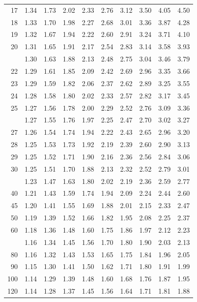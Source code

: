 \documentclass[10pt]{article}
\begin{document}
\begin{longtable}{@{}r!{\vrule width 0.8pt\hspace{0.55em}}rrrrrrrrr@{}}
17 & 1.34 & 1.73 & 2.02 & 2.33 & 2.76 & 3.12 & 3.50 & 4.05 & 4.50 \\
18 & 1.33 & 1.70 & 1.98 & 2.27 & 2.68 & 3.01 & 3.36 & 3.87 & 4.28 \\
19 & 1.32 & 1.67 & 1.94 & 2.22 & 2.60 & 2.91 & 3.24 & 3.71 & 4.10 \\
20 & 1.31 & 1.65 & 1.91 & 2.17 & 2.54 & 2.83 & 3.14 & 3.58 & 3.93 \\
 & 1.30 & 1.63 & 1.88 & 2.13 & 2.48 & 2.75 & 3.04 & 3.46 & 3.79 \\
22 & 1.29 & 1.61 & 1.85 & 2.09 & 2.42 & 2.69 & 2.96 & 3.35 & 3.66 \\
23 & 1.29 & 1.59 & 1.82 & 2.06 & 2.37 & 2.62 & 2.89 & 3.25 & 3.55 \\
24 & 1.28 & 1.58 & 1.80 & 2.02 & 2.33 & 2.57 & 2.82 & 3.17 & 3.45 \\
25 & 1.27 & 1.56 & 1.78 & 2.00 & 2.29 & 2.52 & 2.76 & 3.09 & 3.36 \\
 & 1.27 & 1.55 & 1.76 & 1.97 & 2.25 & 2.47 & 2.70 & 3.02 & 3.27 \\
27 & 1.26 & 1.54 & 1.74 & 1.94 & 2.22 & 2.43 & 2.65 & 2.96 & 3.20 \\
28 & 1.25 & 1.53 & 1.73 & 1.92 & 2.19 & 2.39 & 2.60 & 2.90 & 3.13 \\
29 & 1.25 & 1.52 & 1.71 & 1.90 & 2.16 & 2.36 & 2.56 & 2.84 & 3.06 \\
30 & 1.25 & 1.51 & 1.70 & 1.88 & 2.13 & 2.32 & 2.52 & 2.79 & 3.01 \\
 & 1.23 & 1.47 & 1.63 & 1.80 & 2.02 & 2.19 & 2.36 & 2.59 & 2.77 \\
40 & 1.21 & 1.43 & 1.59 & 1.74 & 1.94 & 2.09 & 2.24 & 2.44 & 2.60 \\
45 & 1.20 & 1.41 & 1.55 & 1.69 & 1.88 & 2.01 & 2.15 & 2.33 & 2.47 \\
50 & 1.19 & 1.39 & 1.52 & 1.66 & 1.82 & 1.95 & 2.08 & 2.25 & 2.37 \\
60 & 1.18 & 1.36 & 1.48 & 1.60 & 1.75 & 1.86 & 1.97 & 2.12 & 2.23 \\
 & 1.16 & 1.34 & 1.45 & 1.56 & 1.70 & 1.80 & 1.90 & 2.03 & 2.13 \\
80 & 1.16 & 1.32 & 1.43 & 1.53 & 1.65 & 1.75 & 1.84 & 1.96 & 2.05 \\
90 & 1.15 & 1.30 & 1.41 & 1.50 & 1.62 & 1.71 & 1.80 & 1.91 & 1.99 \\
100 & 1.14 & 1.29 & 1.39 & 1.48 & 1.60 & 1.68 & 1.76 & 1.87 & 1.95 \\
120 & 1.14 & 1.28 & 1.37 & 1.45 & 1.56 & 1.64 & 1.71 & 1.81 & 1.88 \\

\end{longtable}
\end{document}
